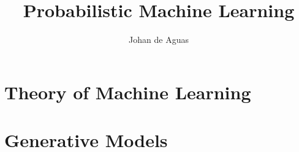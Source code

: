 \documentclass{xclass}
\begin{document}
\begin{titlepage}
    \title{Probabilistic Machine Learning}
    \author{Johan de Aguas}
    \maketitle
\end{titlepage}

\tableofcontents

\chapter{Theory of Machine Learning}



\chapter{Generative Models}




%

\end{document}
